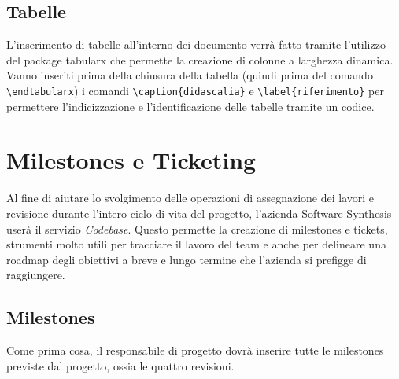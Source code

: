 \subsection{Tabelle}
L'inserimento di tabelle all'interno dei documento verrà fatto tramite l'utilizzo del package tabularx che permette la creazione di colonne a larghezza dinamica. Vanno inseriti prima della chiusura della tabella (quindi prima del comando \verb+\endtabularx+) i comandi \verb+\caption{didascalia}+ e \verb+\label{riferimento}+ per permettere l'indicizzazione e l'identificazione delle tabelle tramite un codice.

\newpage
\section{Milestones e Ticketing}
Al fine di aiutare lo svolgimento delle operazioni di assegnazione dei lavori e revisione durante l'intero ciclo di vita del progetto, l'azienda Software Synthesis userà il servizio \textit{Codebase}. Questo permette la creazione di milestones e tickets, strumenti molto utili per tracciare il lavoro del team e anche per delineare una roadmap degli obiettivi a breve e lungo termine che l'azienda si prefigge di raggiungere.

\subsection{Milestones}
Come prima cosa, il responsabile di progetto dovrà inserire tutte le milestones previste dal progetto, ossia le quattro revisioni.
